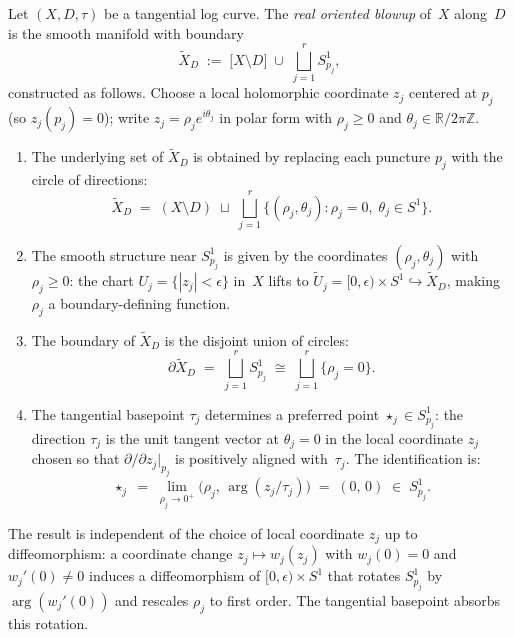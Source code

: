 \begin{construction}
\label{constr:real-oriented-blowup}
Let $(X, D, \tau)$ be a tangential log curve. The
\emph{real oriented blowup} of~$X$ along~$D$ is the smooth
manifold with boundary
\begin{equation}\label{eq:real-oriented-blowup}
\widetilde{X}_D
\;:=\;
\bigl[X \setminus D\bigr]
\;\cup\;
\bigsqcup_{j=1}^{r} S^1_{p_j},
\end{equation}
constructed as follows. Choose a local holomorphic coordinate
$z_j$ centered at $p_j$ (so $z_j(p_j) = 0$); write
$z_j = \rho_j e^{i\theta_j}$ in polar form with
$\rho_j \geq 0$ and $\theta_j \in \mathbb{R} / 2\pi\mathbb{Z}$.
\begin{enumerate}[label=\textup{(\arabic*)}]
\item The underlying set of $\widetilde{X}_D$ is obtained by
 replacing each puncture $p_j$ with the circle of directions:
 \[
 \widetilde{X}_D
 \;=\;
 (X \setminus D)
 \;\sqcup\;
 \bigsqcup_{j=1}^{r}
 \bigl\{(\rho_j, \theta_j) : \rho_j = 0,\;
 \theta_j \in S^1\bigr\}.
 \]
\item The smooth structure near
 $S^1_{p_j}$ is given by the coordinates
 $(\rho_j, \theta_j)$ with $\rho_j \geq 0$: the chart
 $U_j = \{|z_j| < \epsilon\}$ in~$X$ lifts to
 $\widetilde{U}_j = [0, \epsilon) \times S^1 \hookrightarrow
 \widetilde{X}_D$, making $\rho_j$ a boundary-defining function.
\item The boundary of $\widetilde{X}_D$ is the disjoint union of
 circles:
 \begin{equation}\label{eq:boundary-circles}
 \partial \widetilde{X}_D
 \;=\;
 \bigsqcup_{j=1}^{r} S^1_{p_j}
 \;\cong\;
 \bigsqcup_{j=1}^{r}
 \bigl\{\rho_j = 0\bigr\}.
 \end{equation}
\item The tangential basepoint $\tau_j$ determines a preferred
 point $\star_j \in S^1_{p_j}$: the direction $\tau_j$ is the
 unit tangent vector at $\theta_j = 0$ in the local coordinate
 $z_j$ chosen so that $\partial/\partial z_j|_{p_j}$ is
 positively aligned with~$\tau_j$. The identification is:
 \begin{equation}\label{eq:basepoint-identification}
 \star_j
 \;=\;
 \lim_{\rho_j \to 0^+}
 \bigl(\rho_j,\, \arg(z_j / \tau_j)\bigr)
 \;=\;
 (0,\, 0)
 \;\in\;
 S^1_{p_j}.
 \end{equation}
\end{enumerate}
The result is independent of the choice of local coordinate $z_j$
up to diffeomorphism: a coordinate change $z_j \mapsto w_j(z_j)$
with $w_j(0) = 0$ and $w_j'(0) \neq 0$ induces a diffeomorphism
of $[0, \epsilon) \times S^1$ that rotates $S^1_{p_j}$ by
$\arg(w_j'(0))$ and rescales $\rho_j$ to first order. The
tangential basepoint absorbs this rotation.
\end{construction}

